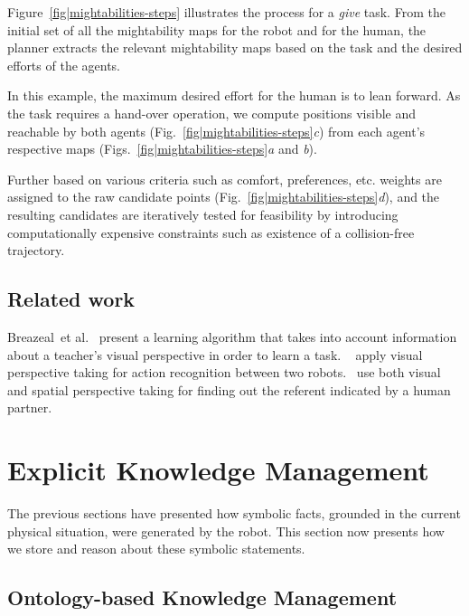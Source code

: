 \documentclass{svmult}
\newcommand{\etal}{et al.\xspace}
\begin{document}
Figure~\ref{fig|mightabilities-steps} illustrates the process for a \emph{give}
task. From the initial set of all the mightability maps for the robot and for
the human, the planner extracts the relevant mightability maps based on the
task and the desired efforts of the agents.

In this example, the maximum desired effort for the human is to lean forward.
As the task requires a hand-over operation, we compute positions visible and
reachable by both agents (Fig.~\ref{fig|mightabilities-steps}{\it c}) from
each agent's respective maps (Figs.~\ref{fig|mightabilities-steps}{\it a} and
{\it b}).

Further based on various criteria such as comfort, preferences, etc. weights
are assigned to the raw candidate points
(Fig.~\ref{fig|mightabilities-steps}{\it d}), and the resulting candidates are
iteratively tested for feasibility by introducing computationally expensive
constraints such as existence of a collision-free trajectory.

\subsection{Related work}

Breazeal~\etal~\cite{breazeal2006} present a learning algorithm that takes
into account information about a teacher's visual perspective in order to learn
a task.  ~\cite{Johnson2005} apply visual perspective taking for action
recognition between two robots.~\cite{Trafton2005} use both visual and spatial
perspective taking for finding out the referent indicated by a human partner.


\section{Explicit Knowledge Management}
\label{cognitivekernel}

The previous sections have presented how symbolic facts, grounded in the
current physical situation, were generated by the robot. This section now
presents how we store and reason about these symbolic statements.

\subsection{Ontology-based Knowledge Management}
\end{document}
